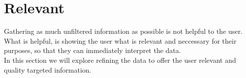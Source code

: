 \newpage
\section{Relevant}
 
Gathering as much unfiltered information as possible is not helpful to the user. What is helpful, is showing the user what is relevant and neccessary for their purposes, so that they can immediately interpret the data.\\

In this section we will explore refining the data to offer the user relevant and quality targeted information.






